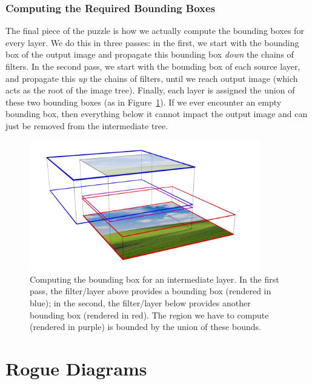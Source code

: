 \documentclass[12pt]{article}
\begin{document}
\subsubsection{Computing the Required Bounding Boxes}

The final piece of the puzzle is how we actually compute the bounding boxes for every layer.  We do
this in three passes: in the first, we start with the bounding box of the output image and propagate
this bounding box \emph{down} the chains of filters.  In the second pass, we start with the bounding box of
each source layer, and propagate this \emph{up} the chains of filters, until we reach output image
(which acts as the root of the image tree).  Finally, each layer is assigned the union of these two
bounding boxes (as in Figure~\ref{fig:bbox-compute}).  If we ever encounter an empty bounding box,
then everything below it cannot impact the output image and can just be removed from the
intermediate tree.

\begin{figure}
    \begin{center}
        \includegraphics[width=0.9\textwidth]{bbox-compute}
    \end{center}
    \caption{Computing the bounding box for an intermediate layer.  In the first pass, the
    filter/layer above provides a bounding box (rendered in {\color{blue} blue}); in the second, the
    filter/layer below provides another bounding box (rendered in {\color{red} red}).  The region we
    have to compute (rendered in {\color{violet} purple}) is bounded by the union of these
    bounds.}\label{fig:bbox-compute}
\end{figure}






\pagebreak

\section{Rogue Diagrams}
\end{document}
